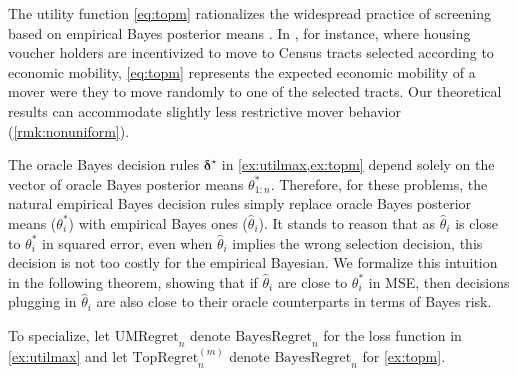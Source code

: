 \documentclass[12pt, reqno]{amsart}
\newcommand\numberthis{\addtocounter{equation}{1}\tag{\theequation}}
\newcommand{\regret}{\mathrm{BayesRegret}_n}
\newcommand{\utilmax}{\textsc{utility maximization by selection}}
\newcommand{\topm}{\textsc{top-{\small $m$} selection}}
\newcommand{\utilmaxreg}{\mathrm{UMRegret}_n}
\newcommand{\topmreg}{\mathrm{TopRegret}_{n}^{(m)}}
\newcommand{\bdelta}{\bm{\delta}}
\numberwithin{equation}{section}
\begin{document}
\begin{rmksq}
\label{rmk:mover}
The utility function \eqref{eq:topm} rationalizes the widespread practice of screening
based on empirical Bayes posterior means
\citep{gilraine2020new,chetty2014measuring,kane2008estimating,hanushek2011economic,bergman2019creating}.
In \citet{bergman2019creating}, for instance,  where housing voucher holders are
incentivized to move to Census tracts selected according to economic mobility,
\eqref{eq:topm} represents the expected economic mobility of a mover were they to move
randomly to one of the selected tracts. Our theoretical results can accommodate slightly
less restrictive mover behavior (\cref{rmk:nonuniform}).%
\end{rmksq}



The oracle Bayes decision rules $\bdelta^\star$ in \cref {ex:utilmax,ex:topm}
depend solely on the vector of oracle Bayes posterior means $\theta_ {1:n}^*$. %
Therefore, for these problems, the natural empirical Bayes decision rules simply replace
oracle Bayes posterior means ($\theta_i^*$) with empirical Bayes ones ($\hat\theta_i$). It
stands to reason that as $\hat\theta_i$ is close to $\theta_i^*$ in squared error, even
when $\hat\theta_i$ implies the wrong selection decision, this decision is not too costly
for the empirical Bayesian. We formalize this intuition in the following theorem, showing that if $\hat\theta_i$ are close to $\theta_i^*$ in MSE,
then decisions plugging in $\hat\theta_i$ are also close to their oracle counterparts in
terms of Bayes risk.


To specialize, let $\utilmaxreg$ denote $\regret$ for the loss function in 
\cref{ex:utilmax} and let $\topmreg$
denote $\regret$ for \cref{ex:topm}. 

\end{document}
